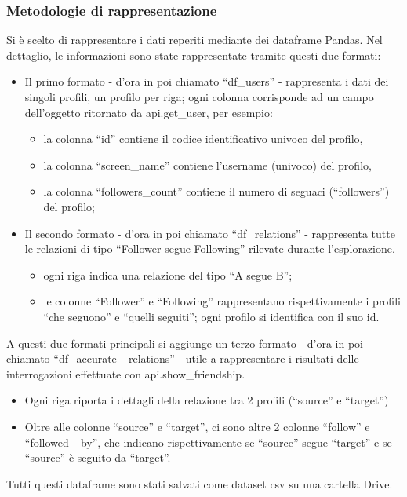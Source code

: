 \documentclass[a4paper, 12pt, twoside]{article}
\begin{document}
\subsubsection{Metodologie di rappresentazione}
Si è scelto di rappresentare i dati reperiti mediante dei dataframe Pandas. 
Nel dettaglio, le informazioni sono state rappresentate tramite questi due formati:
\begin{itemize}
    \item Il primo formato - d’ora in poi chiamato “df\_users” - rappresenta i dati dei singoli profili, un profilo per riga; ogni colonna corrisponde ad un campo dell’oggetto ritornato da api.get\_user, per esempio:
    \begin{itemize}
        \item la colonna “id” contiene il codice identificativo univoco del profilo,
        \item la colonna “screen\_name” contiene l’username (univoco) del profilo,
        \item la colonna “followers\_count” contiene il numero di seguaci (“followers”) del profilo;
    \end{itemize}
    \item Il secondo formato - d’ora in poi chiamato “df\_relations” - rappresenta tutte le relazioni di tipo “Follower segue Following” rilevate durante l’esplorazione.
    \begin{itemize}
        \item ogni riga indica una relazione del tipo “A segue B”;
        \item le colonne “Follower” e “Following” rappresentano rispettivamente i profili “che seguono” e “quelli seguiti”; ogni profilo si identifica con il suo id.
    \end{itemize}
\end{itemize}
A questi due formati principali si aggiunge un terzo formato - d’ora in poi chiamato “df\_accurate\_ relations” - utile a rappresentare i risultati delle interrogazioni effettuate con api.show\_friendship.
\begin{itemize}
    \item Ogni riga riporta i dettagli della relazione tra 2 profili (“source” e “target”)
    \item Oltre alle colonne “source” e “target”, ci sono altre 2 colonne “follow” e “followed \_by”, che indicano  rispettivamente se “source” segue “target” e se “source” è seguito da “target”.
\end{itemize}
Tutti questi dataframe sono stati salvati come dataset csv su una cartella Drive.
\end{document}
